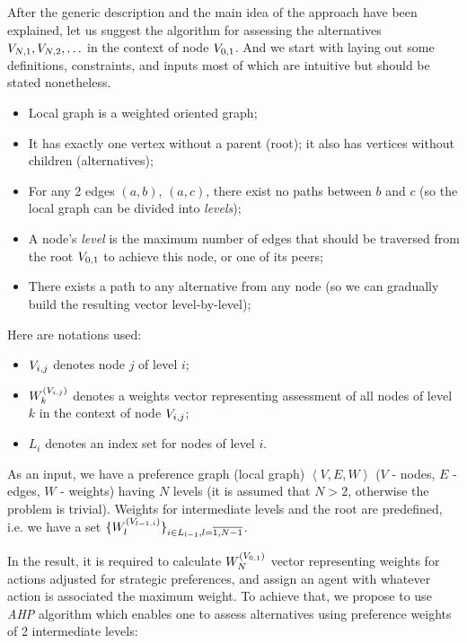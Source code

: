 After the generic description and the main idea of the approach have been explained, let us suggest the algorithm for
assessing the alternatives $V_{N,1}, V_{N,2},\ldots$ in the context of node $V_{0,1}$. And we start with laying out some definitions,
constraints, and inputs most of which are intuitive but should be stated nonetheless.

\begin{itemize}
    \item Local graph is a weighted oriented graph;
    \item It has exactly one vertex without a parent (root); it also has vertices without children (alternatives);
    \item For any 2 edges $(a,b)$, $(a,c)$, there exist no paths between $b$ and $c$ (so the local
        graph can be divided into \textit{levels});
    \item A node's \textit{level} is the maximum number of edges that should be traversed from the root $V_{0,1}$ to
        achieve this node, or one of its peers;
    \item There exists a path to any alternative from any node (so we can gradually build the
        resulting vector level-by-level);
\end{itemize}

Here are notations used:

\begin{itemize}
    \item $V_{i,j}$ denotes node $j$ of level $i$;
    \item $W_{k}^{(V_{i,j})}$ denotes a weights vector representing assessment of all nodes of level
        $k$ in the context of node $V_{i,j}$;
    \item $L_i$ denotes an index set for nodes of level $i$.
\end{itemize}

As an input, we have a preference graph (local graph) $\left< V, E, W \right>$ ($V$ - nodes, $E$ - edges, $W$ - weights)
having $N$ levels (it is assumed that $N>2$, otherwise the problem is trivial).
Weights for intermediate levels and the root are predefined, i.e. we have a set
$\{ W_{l}^{(V_{l-1,i})} \}_{i \in L_{l-1}, l = \overline{1, N-1}}
$.

In the result, it is required to calculate $W_{N}^{(V_{0,1})}$ vector representing weights for actions adjusted for
strategic preferences, and assign an agent with whatever action is associated the maximum weight. To achieve that, we
propose to use \textit{AHP} \cite{saaty-2008} algorithm which enables one to assess alternatives using preference
weights of 2 intermediate levels:

